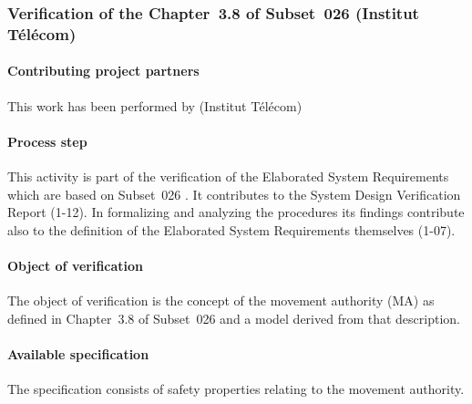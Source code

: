

\subsubsection{Verification of the Chapter~3.8 of Subset~026 (Institut T\'el\'ecom)  }
\label{sec:Subset-026-IT}

\paragraph{Contributing project partners}

This work has been performed by (Institut T\'el\'ecom)

\paragraph{Process step}

This activity is part of the verification of the Elaborated System
Requirements which are based on Subset~026 \cite{subset-026:3.3.0}. It
contributes to the System Design Verification Report (1-12). In
formalizing and analyzing the procedures its findings contribute also
to the definition of the Elaborated System Requirements themselves
(1-07).

\paragraph{Object of verification}

The object of verification is the concept of the movement authority
(MA) as defined in Chapter~3.8 of Subset~026
\cite[Sec.~3.8]{subset-026:3.3.0} and a model derived from that
description.

\paragraph{Available specification}
The specification consists of safety properties relating to the
movement authority.

